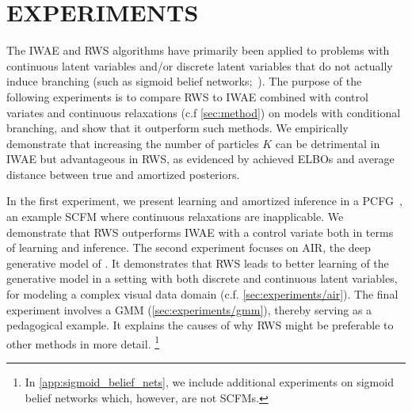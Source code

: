 
\vspace*{-1ex}
\section{EXPERIMENTS}
\vspace*{-1ex}
\label{sec:experiments}


The \gls{IWAE} and \gls{RWS} algorithms have primarily been applied to problems with continuous latent variables and/or discrete latent variables that do not actually induce branching (such as sigmoid belief networks;~\cite{neal1992connectionist}).
%
The purpose of the following experiments is to compare \gls{RWS} to \gls{IWAE} combined with control variates and continuous relaxations (c.f \cref{sec:method}) on models with conditional branching, and show that it outperform such methods.
%
We empirically demonstrate that increasing the number of particles $K$ can be detrimental in \gls{IWAE} but advantageous in \gls{RWS}, as evidenced by achieved \glspl{ELBO} and average distance between true and amortized posteriors.
%

In the first experiment, we present learning and amortized inference in a \gls{PCFG}~\citep{booth1973applying}, an example \gls{SCFM} where continuous relaxations are inapplicable.
We demonstrate that \gls{RWS} outperforms \gls{IWAE} with a control variate both in terms of learning and inference.
The second experiment focuses on \gls{AIR}, the deep generative model of \cite{eslami2016attend}.
It demonstrates that \gls{RWS} leads to better learning of the generative model in a setting with both discrete and continuous latent variables, for modeling a complex visual data domain (c.f. \cref{sec:experiments/air}).
The final experiment involves a \gls{GMM} (\cref{sec:experiments/gmm}), thereby serving as a pedagogical example.
It explains the causes of why \gls{RWS} might be preferable to other methods in more detail.
\footnote{In \cref{app:sigmoid_belief_nets}, we include additional experiments on sigmoid belief networks which, however, are not \glspl{SCFM}.}

